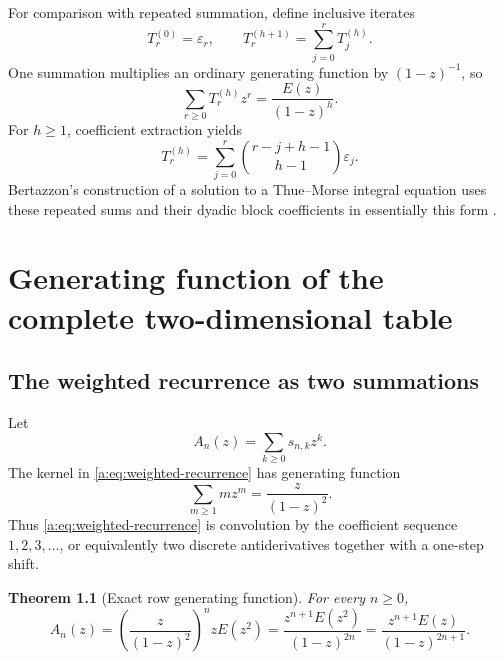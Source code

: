 \documentclass[11pt,a4paper,oneside,openany]{book}
\numberwithin{equation}{chapter}
\newtheorem{theorem}{Theorem}[chapter]
\theoremstyle{definition}
\theoremstyle{remark}
\newcommand{\eps}{\varepsilon}
\newcommand{\Prefix}{T}
\begin{document}
For comparison with repeated summation, define inclusive iterates
\begin{equation}
 \Prefix_r^{(0)}=\eps_r,
 \qquad
 \Prefix_r^{(h+1)}=\sum_{j=0}^{r}\Prefix_j^{(h)}.
 \label{a:eq:inclusive-prefix-definition}
\end{equation}
One summation multiplies an ordinary generating function by \((1-z)^{-1}\),
so
\begin{equation}
 \sum_{r\ge0}\Prefix_r^{(h)}z^r
 =\frac{E(z)}{(1-z)^h}.
 \label{a:eq:inclusive-prefix-gf}
\end{equation}
For \(h\ge1\), coefficient extraction yields
\begin{equation}
 \Prefix_r^{(h)}
 =\sum_{j=0}^{r}
 \binom{r-j+h-1}{h-1}\eps_j.
 \label{a:eq:inclusive-prefix-convolution}
\end{equation}
Bertazzon's construction of a solution to a Thue--Morse integral equation uses
these repeated sums and their dyadic block coefficients in essentially this
form \cite{bertazzon}.
\chapter{Generating function of the complete two-dimensional table}\label{ch:table}

\section{The weighted recurrence as two summations}

Let
\begin{equation}
 A_n(z)=\sum_{k\ge0}s_{n,k}z^k.
 \label{a:eq:row-gf-definition}
\end{equation}
The kernel in \eqref{a:eq:weighted-recurrence} has generating function
\begin{equation}
 \sum_{m\ge1}m z^m=\frac{z}{(1-z)^2}.
 \label{a:eq:kernel-gf}
\end{equation}
Thus \eqref{a:eq:weighted-recurrence} is convolution by the coefficient sequence
\(1,2,3,\ldots\), or equivalently two discrete antiderivatives together with
a one-step shift.

\begin{theorem}[Exact row generating function]
For every \(n\ge0\),
\begin{equation}
 \boxed{
 A_n(z)=
 \left(\frac{z}{(1-z)^2}\right)^n zE(z^2)
 =\frac{z^{n+1}E(z^2)}{(1-z)^{2n}}
 =\frac{z^{n+1}E(z)}{(1-z)^{2n+1}}.}
 \label{a:eq:row-gf}
\end{equation}
\end{theorem}
\end{document}
